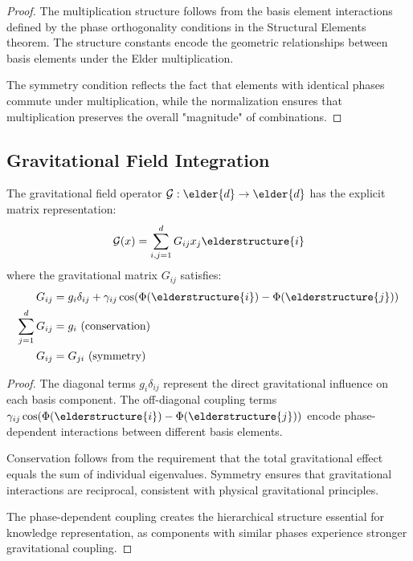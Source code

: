 \begin{proof}
The multiplication structure follows from the basis element interactions defined by the phase orthogonality conditions in the Structural Elements theorem. The structure constants encode the geometric relationships between basis elements under the Elder multiplication.

The symmetry condition reflects the fact that elements with identical phases commute under multiplication, while the normalization ensures that multiplication preserves the overall "magnitude" of combinations.
\end{proof}

\subsection{Gravitational Field Integration}

\begin{theorem}
The gravitational field operator $\mathcal{G}: \elder{d} \to \elder{d}$ has the explicit matrix representation:
\begin{equation}
\mathcal{G}(x) = \sum_{i,j=1}^{d} G_{ij} x_j \elderstructure{i}
\end{equation}
where the gravitational matrix $G_{ij}$ satisfies:
\begin{align}
G_{ij} &= g_i \delta_{ij} + \gamma_{ij} \cos(\Phi(\elderstructure{i}) - \Phi(\elderstructure{j}))\\
\sum_{j=1}^{d} G_{ij} &= g_i \text{ (conservation)}\\
G_{ij} &= G_{ji} \text{ (symmetry)}
\end{align}
\end{theorem}

\begin{proof}
The diagonal terms $g_i \delta_{ij}$ represent the direct gravitational influence on each basis component. The off-diagonal coupling terms $\gamma_{ij} \cos(\Phi(\elderstructure{i}) - \Phi(\elderstructure{j}))$ encode phase-dependent interactions between different basis elements.

Conservation follows from the requirement that the total gravitational effect equals the sum of individual eigenvalues. Symmetry ensures that gravitational interactions are reciprocal, consistent with physical gravitational principles.

The phase-dependent coupling creates the hierarchical structure essential for knowledge representation, as components with similar phases experience stronger gravitational coupling.
\end{proof}

